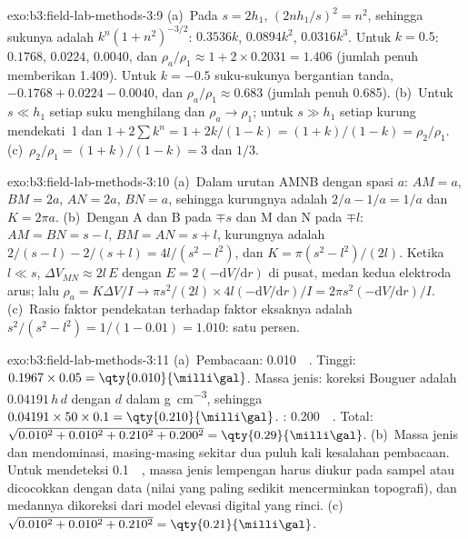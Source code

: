 \begin{solution}{exo:b3:field-lab-methods-3:9}
(a)~Pada $s = 2h_1$, $(2nh_1/s)^2 = n^2$, sehingga sukunya adalah $k^n(1 +
n^2)^{-3/2}$: $0.3536k$, $0.0894k^2$, $0.0316k^3$. Untuk $k = 0.5$:
$\num{0.1768}$, $\num{0.0224}$, $\num{0.0040}$, dan $\rho_a/\rho_1 \approx
1 + 2\times0.2031 = \num{1.406}$ (jumlah penuh memberikan \num{1.409}). Untuk $k
= -0.5$ suku-sukunya bergantian tanda, $-0.1768 + 0.0224 - 0.0040$, dan
$\rho_a/\rho_1 \approx \num{0.683}$ (jumlah penuh \num{0.685}). (b)~Untuk $s \ll
h_1$ setiap suku menghilang dan $\rho_a \to \rho_1$; untuk $s \gg h_1$ setiap
kurung mendekati~1 dan $1 + 2\sum k^n = 1 + 2k/(1 - k) = (1 + k)/(1 -
k) = \rho_2/\rho_1$. (c)~$\rho_2/\rho_1 = (1 + k)/(1 - k) = 3$ dan $1/3$.
\end{solution}

\begin{solution}{exo:b3:field-lab-methods-3:10}
(a)~Dalam urutan AMNB dengan spasi $a$: $AM = a$, $BM = 2a$, $AN = 2a$,
$BN = a$, sehingga kurungnya adalah $2/a - 1/a = 1/a$ dan $K = 2\pi a$.
(b)~Dengan A dan B pada $\mp s$ dan M dan N pada $\mp l$: $AM = BN = s - l$,
$BM = AN = s + l$, kurungnya adalah $2/(s - l) - 2/(s + l) = 4l/(s^2 -
l^2)$, dan $K = \pi(s^2 - l^2)/(2l)$. Ketika $l \ll s$, $\Delta V_{MN}
\approx 2l\,E$ dengan $E = 2(-\mathrm{d}V/\mathrm{d}r)$ di pusat, medan
kedua elektroda arus; lalu $\rho_a = K\Delta V/I \to
\pi s^2/(2l)\times 4l(-\mathrm{d}V/\mathrm{d}r)/I = 2\pi s^2(-
\mathrm{d}V/\mathrm{d}r)/I$. (c)~Rasio faktor pendekatan terhadap
faktor eksaknya adalah $s^2/(s^2 - l^2) = 1/(1 - 0.01) = 1.010$: satu persen.
\end{solution}

\begin{solution}{exo:b3:field-lab-methods-3:11}
(a)~Pembacaan: \qty{0.010}{\milli\gal}. Tinggi:
$0.1967\times0.05 = \qty{0.010}{\milli\gal}$. Massa jenis: koreksi Bouguer
adalah $0.04191\,h\,d$ dengan $d$ dalam \unit{g.cm^{-3}}, sehingga
$0.04191\times50\times0.1 = \qty{0.210}{\milli\gal}$. :
\qty{0.200}{\milli\gal}. Total: $\sqrt{0.010^2 + 0.010^2 + 0.210^2 +
0.200^2} = \qty{0.29}{\milli\gal}$. (b)~Massa jenis dan 
mendominasi, masing-masing sekitar dua puluh kali kesalahan pembacaan. Untuk mendeteksi
\qty{0.1}{\milli\gal}, massa jenis lempengan harus diukur pada
sampel atau dicocokkan dengan data (nilai yang paling sedikit mencerminkan
topografi), dan medannya dikoreksi dari model elevasi digital yang rinci.
(c)~$\sqrt{0.010^2 + 0.010^2 + 0.210^2} = \qty{0.21}{\milli\gal}$.
\end{solution}

